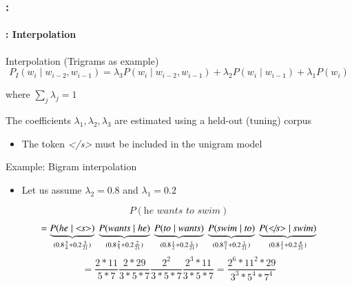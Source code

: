 \documentclass[xcolor=table]{beamer}
\begin{document}
\begin{frame}
	\frametitle{\insertshortsubtitle: \insertsection}
	\framesubtitle{\insertsubsection: Interpolation}
	
	\begin{block}{Interpolation (Trigrams as example)}
		\[
		P_I(w_i \mid w_{i-2}, w_{i-1}) =
		\lambda_3 P(w_i \mid w_{i-2}, w_{i-1})
		+ \lambda_2 P(w_i \mid w_{i-1})
		+ \lambda_1 P(w_i)
		\]
		
		where $\sum_j \lambda_j = 1$
		
		The coefficients $\lambda_1, \lambda_2, \lambda_3$ are estimated using a held-out (tuning) corpus
		
		\begin{itemize}
			\item The token \textit{\textless/s\textgreater} must be included in the unigram model
		\end{itemize}
	\end{block}
	
	
	\begin{exampleblock}{Example: Bigram interpolation}
		\begin{itemize}
			\item Let us assume $\lambda_2=0.8$ and $\lambda_1=0.2$
		\end{itemize}
		\small
		\[P(\textit{he wants to swim}) \]
		\[ =
		\underbrace{P(\textit{he} \mid \textit{\textless s\textgreater})}_{(0.8\frac{3}{4} + 0.2\frac{3}{21})}\ 
		\underbrace{P(\textit{wants} \mid \textit{he})}_{(0.8\frac{2}{3} + 0.2\frac{2}{21})}\ 
		\underbrace{P(\textit{to} \mid \textit{wants})}_{(0.8\frac{1}{2} + 0.2\frac{1}{21})}\ 
		\underbrace{P(\textit{swim} \mid \textit{to})}_{(0.8\frac{0}{1} + 0.2\frac{1}{21})}\  
		\underbrace{P(\textit{\textless/s\textgreater} \mid \textit{swim})}_{(0.8\frac{1}{1} + 0.2\frac{4}{21})}
		\]
		\scriptsize
		\[= \frac{2 * 11}{5 * 7} \frac{2 * 29}{3 * 5 * 7} \frac{2^2}{3 * 5 * 7} \frac{2^3 * 11}{3 * 5 * 7} = 
		\frac{2^6 * 11^2 * 29}{3^3 * 5^4 * 7^4}\]
	\end{exampleblock}

\end{frame}
\end{document}
